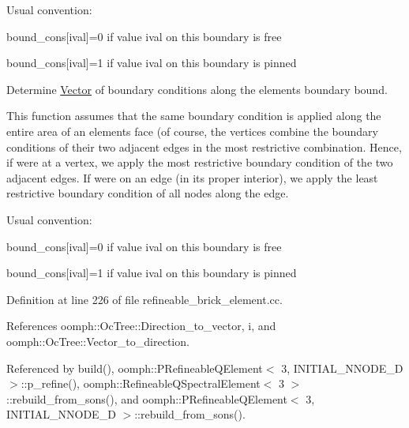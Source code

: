 Usual convention\+:
\begin{DoxyItemize}
\item bound\+\_\+cons\mbox{[}ival\mbox{]}=0 if value ival on this boundary is free
\item bound\+\_\+cons\mbox{[}ival\mbox{]}=1 if value ival on this boundary is pinned
\end{DoxyItemize}

Determine \hyperlink{classoomph_1_1Vector}{Vector} of boundary conditions along the element\textquotesingle{}s boundary bound.

This function assumes that the same boundary condition is applied along the entire area of an element\textquotesingle{}s face (of course, the vertices combine the boundary conditions of their two adjacent edges in the most restrictive combination. Hence, if we\textquotesingle{}re at a vertex, we apply the most restrictive boundary condition of the two adjacent edges. If we\textquotesingle{}re on an edge (in its proper interior), we apply the least restrictive boundary condition of all nodes along the edge.

Usual convention\+:
\begin{DoxyItemize}
\item bound\+\_\+cons\mbox{[}ival\mbox{]}=0 if value ival on this boundary is free
\item bound\+\_\+cons\mbox{[}ival\mbox{]}=1 if value ival on this boundary is pinned 
\end{DoxyItemize}

Definition at line 226 of file refineable\+\_\+brick\+\_\+element.\+cc.



References oomph\+::\+Oc\+Tree\+::\+Direction\+\_\+to\+\_\+vector, i, and oomph\+::\+Oc\+Tree\+::\+Vector\+\_\+to\+\_\+direction.



Referenced by build(), oomph\+::\+P\+Refineable\+Q\+Element$<$ 3, I\+N\+I\+T\+I\+A\+L\+\_\+\+N\+N\+O\+D\+E\+\_\+D $>$\+::p\+\_\+refine(), oomph\+::\+Refineable\+Q\+Spectral\+Element$<$ 3 $>$\+::rebuild\+\_\+from\+\_\+sons(), and oomph\+::\+P\+Refineable\+Q\+Element$<$ 3, I\+N\+I\+T\+I\+A\+L\+\_\+\+N\+N\+O\+D\+E\+\_\+D $>$\+::rebuild\+\_\+from\+\_\+sons().

\mbox{\label{classoomph_1_1RefineableQElement_3_013_01_4_ac61083ce6abe6338ec5d7795d9f1e051}} 
